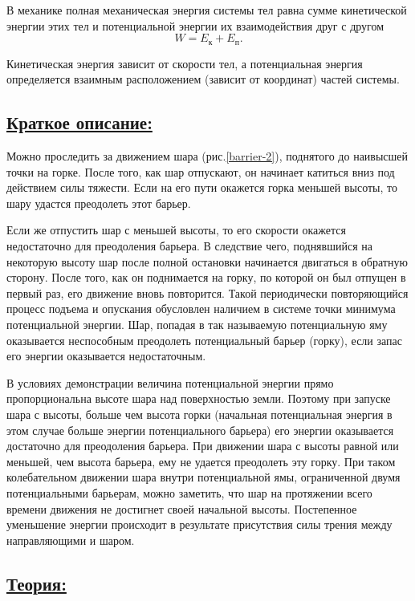 \documentclass[14pt,a4paper,oneside]{extarticle}	%
\begin{document}
		В механике полная механическая энергия системы тел равна сумме кинетической энергии этих тел и потенциальной энергии их взаимодействия друг с другом
$$ W = E_{\text{к}} + E_{\text{п}}.$$

Кинетическая энергия зависит от скорости тел, а потенциальная энергия определяется взаимным расположением (зависит от координат) частей системы.

\subsection*{\underline{Краткое описание:}}
 
Можно проследить за движением шара (рис.\ref{barrier-2}), поднятого до наивысшей точки на горке.
После того, как шар отпускают, он начинает катиться вниз под действием силы тяжести.
Если на его пути окажется горка меньшей высоты, то шару удастся преодолеть этот барьер. 

Если же отпустить шар с меньшей высоты, то его скорости окажется недостаточно для преодоления барьера. 
В следствие чего, поднявшийся на некоторую высоту шар после полной остановки начинается двигаться в обратную сторону.
После того, как он поднимается на горку, по которой он был отпущен в первый раз, его движение вновь повторится.
Такой периодически повторяющийся процесс подъема и опускания обусловлен наличием в системе точки минимума потенциальной энергии.
Шар, попадая в так называемую потенциальную яму оказывается неспособным преодолеть потенциальный барьер (горку), если запас его энергии оказывается недостаточным.

В условиях демонстрации величина потенциальной энергии прямо пропорциональна высоте шара над поверхностью земли.
Поэтому при запуске шара с высоты, больше чем высота горки (начальная потенциальная энергия в этом случае больше энергии потенциального барьера) его энергии оказывается достаточно для преодоления барьера.
При движении шара с высоты равной или меньшей, чем высота барьера, ему не удается преодолеть эту горку.
При таком колебательном движении шара внутри потенциальной ямы, ограниченной двумя потенциальными барьерам, можно заметить, что шар на протяжении всего времени движения не достигнет своей начальной высоты.
Постепенное уменьшение энергии происходит в результате присутствия силы трения между направляющими и шаром.

\subsection*{\underline{Теория:}}
	
\end{document}

